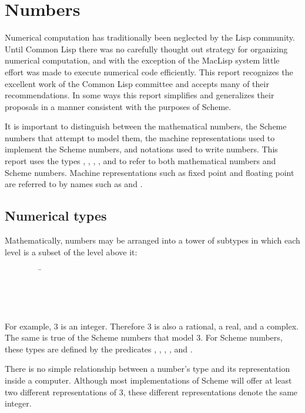 \chapter{Numbers}
\label{numberchapter}

Numerical computation has traditionally been neglected by the Lisp
community.  Until Common Lisp there was no carefully thought out
strategy for organizing numerical computation, and with the exception of
the MacLisp system \cite{Pitman83} little effort was made to
execute numerical code efficiently.  This report recognizes the excellent work
of the Common Lisp committee and accepts many of their recommendations.
In some ways this report simplifies and generalizes their proposals in a manner
consistent with the purposes of Scheme.

It is important to distinguish between the mathematical numbers, the
Scheme numbers that attempt to model them, the machine representations
used to implement the Scheme numbers, and notations used to write numbers.
This report uses the types , , ,
, and  to refer to both mathematical numbers
and Scheme numbers.  Machine representations such as fixed point and
floating point are referred to by names such as  and
.

\section{Numerical types}
\label{numericaltypes}

\vest Mathematically, numbers may be arranged into a tower of subtypes
in which each level is a subset of the level above it:
\begin{tabbing}
\ \ \ \ \ \ \ \ \ \= \\
\>  \\
\>  \\
\>  \\
\>  
\end{tabbing}

For example, 3 is an integer.  Therefore 3 is also a rational,
a real, and a complex.  The same is true of the Scheme numbers
that model 3.  For Scheme numbers, these types are defined by the
predicates , , , ,
and .

There is no simple relationship between a number's type and its
representation inside a computer.  Although most implementations of
Scheme will offer at least two different representations of 3, these
different representations denote the same integer.

